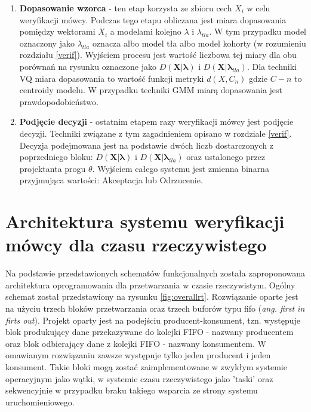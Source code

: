 \begin{enumerate}
    \item{\textbf{Dopasowanie wzorca}} - ten etap korzysta ze zbioru cech $X_i$ w celu weryfikacji mówcy. Podczas tego etapu obliczana jest miara dopasowania pomiędzy wektorami $X_i$ a modelami kolejno $\lambda$ i $\lambda_{tla}$. W tym przypadku model oznaczony jako $\lambda_{tla}$ oznacza albo model tła albo model kohorty (w rozumieniu rozdziału {\ref{verif}}). Wyjściem procesu jest wartość liczbowa tej miary dla obu porównań na rysunku oznaczone jako $D(\bm{X}|\bm{\lambda})$ i $D(\bm{X}|\bm{\lambda}_{tla})$. Dla techniki VQ miara dopasowania to wartość funkcji metryki $d(X,C_n)$ gdzie $C-n$ to centroidy modelu. W przypadku techniki GMM miarą dopasowania jest prawdopodobieństwo.
\item{\textbf{Podjęcie decyzji}} - ostatnim etapem razy weryfikacji mówcy jest podjęcie decyzji. Techniki związane z tym zagadnieniem opisano w rozdziale {\ref{verif}}. Decyzja podejmowana jest na podstawie dwóch liczb dostarczonych z poprzedniego bloku: $D(\bm{X}|\bm{\lambda})$ i $D(\bm{X}|\bm{\lambda}_{tla})$ oraz ustalonego przez projektanta progu $\theta$. Wyjściem całego systemu jest zmienna binarna przyjmująca wartości: Akceptacja lub Odrzucenie.
\end{enumerate}

\section{Architektura systemu weryfikacji mówcy dla czasu rzeczywistego}

Na podstawie przedstawionych schematów funkcjonalnych została zaproponowana architektura oprogramowania dla przetwarzania w czasie rzeczywistym. Ogólny schemat został przedstawiony na rysunku {\ref{fig:overallrt}}. Rozwiązanie oparte jest na użyciu trzech bloków przetwarzania oraz trzech buforów typu fifo (\textit{ang. first in firts out}). Projekt oparty jest na podejściu producent-konsument, tzn. występuje blok produkujący dane przekazywane do kolejki FIFO - nazwany producentem oraz blok
odbierający dane z kolejki FIFO - nazwany konsumentem.  W omawianym rozwiązaniu zawsze występuje tylko jeden producent i jeden konsument. Takie bloki mogą zostać zaimplementowane w zwykłym systemie operacyjnym jako wątki, w systemie czasu rzeczywistego jako 'taski' oraz sekwencyjnie w przypadku braku takiego wsparcia ze strony systemu uruchomieniowego. 

